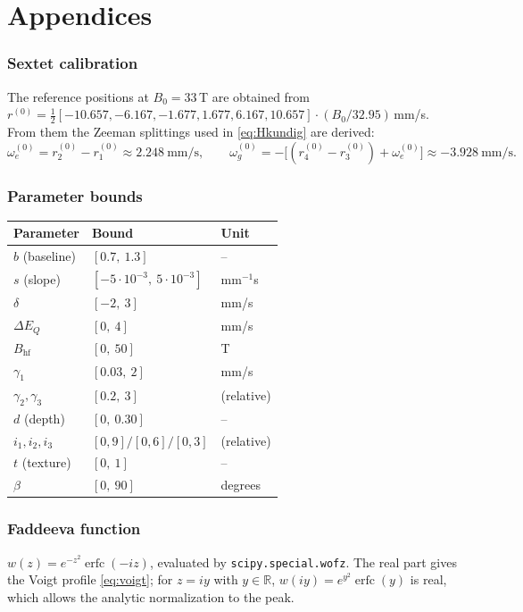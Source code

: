 \documentclass[11pt,a4paper]{article}
\newcommand{\BHF}{B_{\mathrm{hf}}}
\newcommand{\dEQ}{\Delta E_{Q}}
\newcommand{\code}[1]{\texttt{\small #1}}
\DeclareMathOperator{\erfc}{erfc}
\begin{document}
\appendix
\part{Appendices}

\section{Sextet calibration}\label{ap:calib}
The reference positions at $B_0=33\,$T are obtained from
$r^{(0)}=\tfrac12[-10.657,-6.167,-1.677,1.677,6.167,10.657]\cdot(B_0/32.95)\,$mm/s.
From them the Zeeman splittings used in \eqref{eq:Hkundig} are derived:
\begin{equation}
  \omega_e^{(0)} = r^{(0)}_2-r^{(0)}_1 \approx 2.248\ \text{mm/s},\qquad
  \omega_g^{(0)} = -\bigl[(r^{(0)}_4-r^{(0)}_3)+\omega_e^{(0)}\bigr] \approx -3.928\ \text{mm/s}.
\end{equation}

\section{Parameter bounds}\label{ap:bounds}
\begin{center}
\begin{tabular}{@{}lll@{}}
\toprule
Parameter & Bound & Unit\\
\midrule
$b$ (baseline) & $[0.7,\ 1.3]$ & --\\
$s$ (slope) & $[-5\cdot10^{-3},\ 5\cdot10^{-3}]$ & mm$^{-1}$s\\
$\delta$ & $[-2,\ 3]$ & mm/s\\
$\dEQ$ & $[0,\ 4]$ & mm/s\\
$\BHF$ & $[0,\ 50]$ & T\\
$\gamma_1$ & $[0.03,\ 2]$ & mm/s\\
$\gamma_2,\gamma_3$ & $[0.2,\ 3]$ & (relative)\\
$d$ (depth) & $[0,\ 0.30]$ & --\\
$i_1,i_2,i_3$ & $[0,9]/[0,6]/[0,3]$ & (relative)\\
$t$ (texture) & $[0,\ 1]$ & --\\
$\beta$ & $[0,\ 90]$ & degrees\\
\bottomrule
\end{tabular}
\end{center}

\section{Faddeeva function}
$w(z)=e^{-z^2}\erfc(-iz)$, evaluated by \code{scipy.special.wofz}. The real part
gives the Voigt profile \eqref{eq:voigt}; for $z=iy$ with $y\in\mathbb R$,
$w(iy)=e^{y^2}\erfc(y)$ is real, which allows the analytic normalization to the peak.
\end{document}
